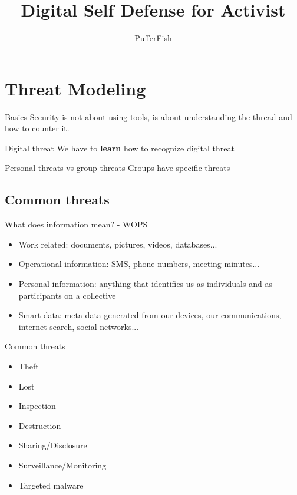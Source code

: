 \documentclass[11pt]{beamer}
\author{PufferFish}
\title{Digital Self Defense for Activist}
\begin{document}
\begin{frame}
\titlepage
\end{frame}

\begin{frame}
\tableofcontents
\end{frame}

\section{Threat Modeling}
\begin{frame}{Basics}
Security is not about using tools, is about understanding the thread and how to counter it.
\end{frame}
\begin{frame}{Digital threat}
We have to \textbf{learn} how to recognize  digital threat
\end{frame}
\begin{frame}{Personal threats vs group threats}
Groups have specific threats
\end{frame}
\subsection{Common threats}
\begin{frame}{What does information mean? - WOPS}
\begin{itemize}
\item Work related: documents, pictures, videos, databases...
\item Operational information: SMS, phone numbers, meeting minutes...
\item Personal information: anything that identifies us as individuals and as participants on a collective
\item Smart data: meta-data generated from our devices, our communications, internet search, social networks...
\end{itemize}
\end{frame}
\begin{frame}{Common threats}
\begin{itemize}
\item Theft
\item Lost
\item Inspection
\item Destruction
\item Sharing/Disclosure
\item Surveillance/Monitoring
\item Targeted malware
\end{itemize}
\end{frame}
\end{document}

